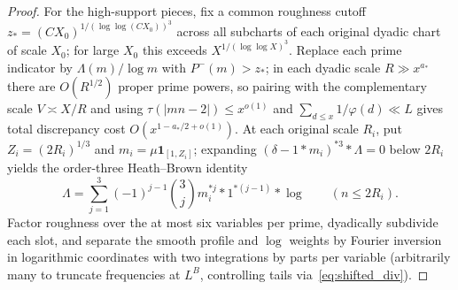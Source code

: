 \documentclass[11pt,reqno]{amsart}
\theoremstyle{remark}
\newcommand{\ind}{\mathbf{1}}
\numberwithin{equation}{section}
\begin{document}
\begin{proof}
For the high-support pieces, fix a common roughness cutoff $z_* = (C X_0)^{1/(\log\log(C X_0))^3}$ across all subcharts of each original dyadic chart of scale $X_0$; for large $X_0$ this exceeds $X^{1/(\log\log X)^3}$. Replace each prime indicator by $\Lambda(m)/\log m$ with $P^-(m) > z_*$; in each dyadic scale $R \gg x^{a_*}$ there are $O(R^{1/2})$ proper prime powers, so pairing with the complementary scale $V \asymp X/R$ and using $\tau(|mn-2|) \le x^{o(1)}$ and $\sum_{d\le x} 1/\varphi(d) \ll L$ gives total discrepancy cost $O(x^{1-a_*/2+o(1)})$. At each original scale $R_i$, put $Z_i = (2R_i)^{1/3}$ and $m_i = \mu\ind_{[1,Z_i]}$; expanding $(\delta - 1*m_i)^{*3}*\Lambda = 0$ below $2R_i$ yields the order-three Heath--Brown identity
\begin{equation}\label{eq:hb3}
\Lambda = \sum_{j=1}^3 (-1)^{j-1}\binom{3}{j} m_i^{*j} * 1^{*(j-1)} * \log \qquad (n \le 2R_i).
\end{equation}
Factor roughness over the at most six variables per prime, dyadically subdivide each slot, and separate the smooth profile and $\log$ weights by Fourier inversion in logarithmic coordinates with two integrations by parts per variable (arbitrarily many to truncate frequencies at $L^B$, controlling tails via~\eqref{eq:shifted_div}).


\end{proof}
\end{document}
